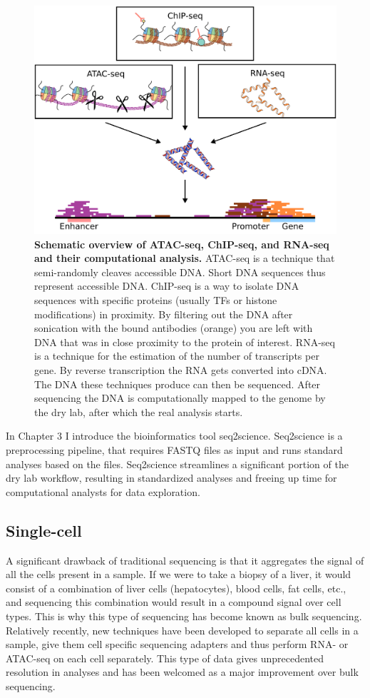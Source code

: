 \begin{figure}
    \center
    \includegraphics[width=0.8\linewidth]{ch.introduction/imgs/analysis.png}
    \caption{\textbf{Schematic overview of ATAC-seq, ChIP-seq, and RNA-seq and their computational analysis.} ATAC-seq is a technique that semi-randomly cleaves accessible DNA. Short DNA sequences thus represent accessible DNA. ChIP-seq is a way to isolate DNA sequences with specific proteins (usually TFs or histone modifications) in proximity. By filtering out the DNA after sonication with the bound antibodies (orange) you are left with DNA that was in close proximity to the protein of interest. RNA-seq is a technique for the estimation of the number of transcripts per gene. By reverse transcription the RNA gets converted into cDNA. The DNA these techniques produce can then be sequenced. After sequencing the DNA is computationally mapped to the genome by the dry lab, after which the real analysis starts. }
    \label{fig:analysis}
\end{figure}

In Chapter 3 I introduce the bioinformatics tool seq2science. Seq2science is a preprocessing pipeline, that requires FASTQ files as input and runs standard analyses based on the files. Seq2science streamlines a significant portion of the dry lab workflow, resulting in standardized analyses and freeing up time for computational analysts for data exploration.

\subsection{Single-cell}

A significant drawback of traditional sequencing is that it aggregates the signal of all the cells present in a sample. If we were to take a biopsy of a liver, it would consist of a combination of liver cells (hepatocytes), blood cells, fat cells, etc., and sequencing this combination would result in a compound signal over cell types. This is why this type of sequencing has become known as bulk sequencing. Relatively recently, new techniques have been developed to separate all cells in a sample, give them cell specific sequencing adapters and thus perform RNA- or ATAC-seq on each cell separately\cite{Buenrostro2015_sc,Tang2009}. This type of data gives unprecedented resolution in analyses and has been welcomed as a major improvement over bulk sequencing.

